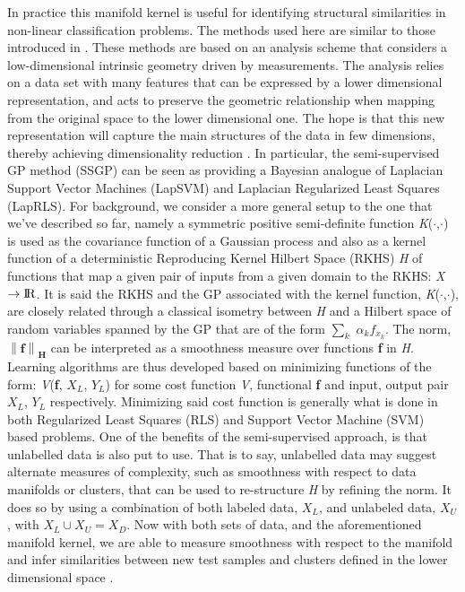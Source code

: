 \documentclass{article}
\begin{document}
In practice this manifold kernel is useful for identifying structural similarities in non-linear classification problems. The methods used here are similar to those introduced in \cite{semiSuperGaussProClass}. These methods are based on an analysis scheme that considers a low-dimensional intrinsic geometry driven by measurements. The analysis relies on a data set with many features that can be expressed by a lower dimensional representation, and acts to preserve the geometric relationship when mapping from the original space to the lower dimensional one. The hope is that this new representation will capture the main structures of the data in few dimensions, thereby achieving dimensionality reduction \cite{diffMapsSigProc}. In particular, the semi-supervised GP method (SSGP) can be seen as providing a Bayesian analogue of Laplacian Support Vector Machines (LapSVM) and Laplacian Regularized Least Squares (LapRLS). For background, we consider a more general setup to the one that we've described so far, namely a symmetric positive semi-definite function \textit{K}($\cdot$,$\cdot$) is used as the covariance function of a Gaussian process and also as a kernel function of a deterministic Reproducing Kernel Hilbert Space (RKHS) \textit{H} of functions that map a given pair of inputs from a given domain to the RKHS: \textit{X} $\rightarrow {\rm I\!R}$. It is said the RKHS and the GP associated with the kernel function, \textit{K}($\cdot$,$\cdot$), are closely related through a classical isometry between \textit{H} and a Hilbert space of random variables spanned by the GP that are of the form $\sum_{k}$ $\alpha_k$\textbf{$f_{x_{k}}$}. The norm, $\left\| \textbf{f} \right\|_{\textbf{H}}$ can be interpreted as a smoothness measure over functions \textbf{f} in \textit{H}. Learning algorithms are thus developed based on minimizing functions of the form: \textit{V}(\textbf{f}, \textit{$X_{L}$}, \textit{$Y_{L}$}) for some cost function \textit{V}, functional  \textbf{f} and input, output pair \textit{$X_{L}$}, \textit{$Y_{L}$} respectively. Minimizing said cost function is generally what is done in both Regularized Least Squares (RLS) and Support Vector Machine (SVM) based problems. One of the benefits of the semi-supervised approach, is that unlabelled data is also put to use. That is to say, unlabelled data may suggest alternate measures of complexity, such as smoothness with respect to data manifolds or clusters, that can be used to re-structure \textit{H} by refining the norm. It does so by using a combination of both labeled data, \textit{$X_{L}$}, and unlabeled data, \textit{$X_{U}$}, with $\textit{$X_{L}$} \cup \textit{$X_{U}$} = \textit{$X_{D}$}$. Now with both sets of data, and the aforementioned manifold kernel, we are able to measure smoothness with respect to the manifold and infer similarities between new test samples and clusters defined in the lower dimensional space \cite{semiSuperGaussProClass}. 
\end{document}
